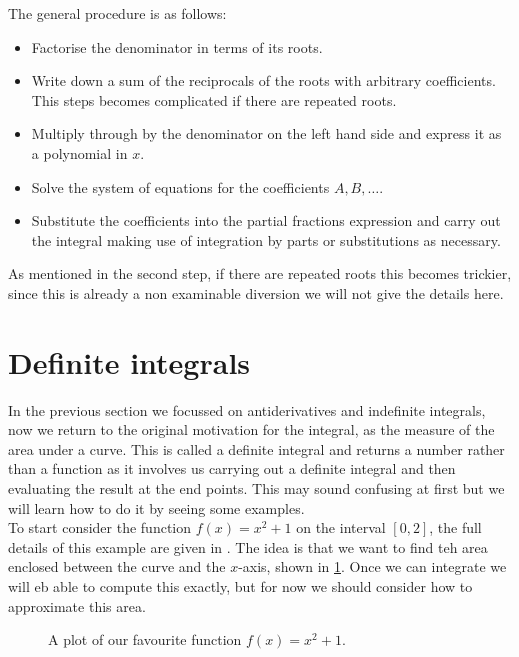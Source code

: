 The general procedure is as follows:
\begin{itemize}
\item Factorise the denominator in terms of its roots.
\item Write down a sum of the reciprocals of the roots with arbitrary coefficients. This steps becomes complicated if there are repeated roots.
\item Multiply through by the denominator on the left hand side and express it as a polynomial in $x$.
\item Solve the system of equations for the coefficients $A, B, \dots{}$.
\item Substitute the coefficients into the partial fractions expression and carry out the integral making use of integration by parts or substitutions as necessary.
\end{itemize}

As mentioned in the second step, if there are repeated roots this becomes trickier, since this is already a non examinable diversion we will not give the details here. 

\section{Definite integrals}

In the previous section we focussed on antiderivatives and indefinite integrals, now we return to the original motivation for the integral, as the measure of the area under a curve. This is called a definite integral and returns a number rather than a function as it involves us carrying out a definite integral and then evaluating the result at the end points. This may sound confusing at first but we will learn how to do it by seeing some examples.\\

To start consider the function $f(x)=x^{2}+1$ on the interval $[0,2]$, the full details of this example are given in \cite{calcI}. The idea is that we want to find teh area enclosed between the curve and the $x$-axis, shown in \cref{fig: first integral}. Once we can integrate we will eb able to compute this exactly, but for now we should consider how to approximate this area.\\

\begin{figure}[ht]
    \centering
{}
    \caption{A plot of our favourite function $f(x)=x^{2}+1$.}
        \label{fig: first integral}
\end{figure}

